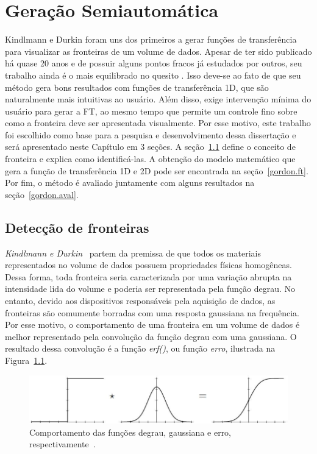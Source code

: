 
\chapter{Geração Semiautomática}
\label{gordon}

	Kindlmann e Durkin foram uns dos primeiros a gerar funções de transferência para visualizar as fronteiras de um volume de dados. Apesar de ter sido publicado há quase 20 anos e de possuir alguns pontos fracos já estudados por outros, seu trabalho ainda é o mais equilibrado no quesito . Isso deve-se ao fato de que seu método gera bons resultados com funções de transferência 1D, que são naturalmente mais intuitivas ao usuário. Além disso, exige intervenção mínima do usuário para gerar a FT, ao mesmo tempo que permite um controle fino sobre como a fronteira deve ser apresentada visualmente. Por esse motivo, este trabalho foi escolhido como base para a pesquisa e desenvolvimento dessa dissertação e será apresentado neste Capítulo em 3 seções. A seção~\ref{gordon.bound} define o conceito de fronteira e explica como identificá-las. A obtenção do modelo matemático que gera a função de transferência 1D e 2D pode ser encontrada na seção~\ref{gordon.ft}. Por fim, o método é avaliado juntamente com alguns resultados na seção~\ref{gordon.aval}.
	
\section{Detecção de fronteiras}
\label{gordon.bound}
	\textit{Kindlmann e Durkin}~\cite{gordon} partem da premissa de que todos os materiais representados no volume de dados possuem propriedades físicas homogêneas. Dessa forma, toda fronteira seria caracterizada por uma variação abrupta na intensidade lida do volume e poderia ser representada pela função degrau. No entanto, devido aos dispositivos responsáveis pela aquisição de dados, as fronteiras são comumente borradas com uma resposta gaussiana na frequência. Por esse motivo, o comportamento de uma fronteira em um volume de dados é melhor representado pela convolução da função degrau com uma gaussiana. O resultado dessa convolução é a função \textit{erf()}, ou função \textit{erro}, ilustrada na Figura~\ref{fig:boundary_model}.
	
\begin{figure}[h]
	\centering
	\includegraphics[width=1\textwidth]{images/g_boundary_model}
	\caption{Comportamento das funções degrau, gaussiana e erro, respectivamente~\cite{gordon}.}
	\label{fig:boundary_model}
\end{figure}

